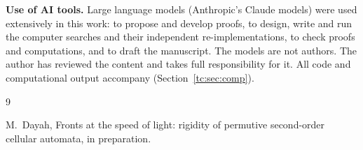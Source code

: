 \documentclass[11pt]{amsart}
\theoremstyle{definition}
\theoremstyle{remark}
\begin{document}
\medskip
\noindent\textbf{Use of AI tools.} Large language models (Anthropic's Claude models) were used extensively in this work: to propose and develop proofs, to design, write and run the computer searches and their independent re-implementations, to check proofs and computations, and to draft the manuscript. The models are not authors. The author has reviewed the content and takes full responsibility for it. All code and computational output accompany \cite{PaperB} (Section~\ref{tc:sec:comp}).

\begin{thebibliography}{9}

 M.~Dayah, Fronts at the speed of light: rigidity of permutive second-order cellular automata, in preparation.

\end{thebibliography}
\end{document}
